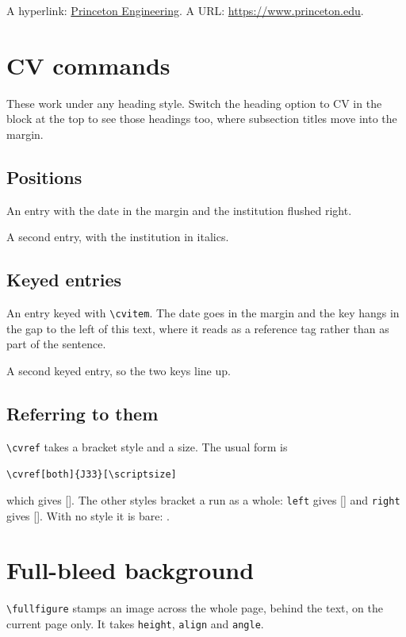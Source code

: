 \documentclass[
  11pt,                   %
  class=article,          %
  theme=classic,          %
  titleformat=simple,     %
  columns=one,            %
  logo=running,           %
  logocolor=color,        %
  signature=engineering,  %
  fontset=auto,           %
  marginpos=left,         %
  itemcolor=pu-gray,      %
  itemsep=1ex,            %
  colorlinks=true,        %
  date=true,              %
  titledate=false,        %
  draft=false,            %
]{princeton}
\begin{document}
A hyperlink: \href{https://engineering.princeton.edu}{Princeton Engineering}.
A URL: \url{https://www.princeton.edu}.

\section{CV commands}

These work under any heading style. Switch the heading option to CV in the
block at the top to see those headings too, where subsection titles move into
the margin.

\subsection*{Positions}

 An entry with the date in the
margin and the institution flushed right.

 A second entry, with the
institution in italics.

\subsection*{Keyed entries}

 An entry keyed with \verb|\cvitem|. The date goes in the
margin and the key hangs in the gap to the left of this text, where it reads as
a reference tag rather than as part of the sentence.

 A second keyed entry, so the two keys line up.

\subsection*{Referring to them}

\verb|\cvref| takes a bracket style and a size. The usual form is

\verb|\cvref[both]{J33}[\scriptsize]|

which gives [\scriptsize]. The other styles bracket a run as a
whole: \verb|left| gives [\scriptsize] and \verb|right| gives
[\scriptsize]. With no style it is bare: .

\section{Full-bleed background}

\verb|\fullfigure| stamps an image across the whole page, behind the text, on
the current page only. It takes \texttt{height}, \texttt{align} and
\texttt{angle}.


\blindtext
\end{document}

